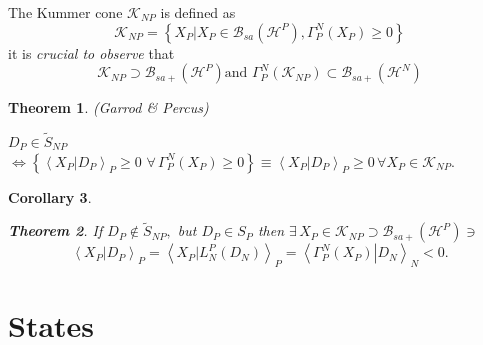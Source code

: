 \documentclass[aps,preprint]{revtex4}%
\newtheorem{theorem}{Theorem}
\newtheorem{corollary}[theorem]{Corollary}
\begin{document}
The Kummer cone $\mathcal{K}_{NP}$ is defined as
\begin{equation}
\mathcal{K}_{NP}=\left\{  \left.  X_{P}\right\vert X_{P}\in\mathcal{B}%
_{sa}\left(  \mathcal{H}^{P}\right)  ,\Gamma_{P}^{N}\left(  X_{P}\right)
\geq0\right\}
\end{equation}
it is \emph{crucial to observe} that
\begin{equation}
\mathcal{K}_{NP}\supset\mathcal{B}_{sa+}\left(  \mathcal{H}^{P}\right)  \text{
and }\Gamma_{P}^{N}\left(  \mathcal{K}_{NP}\right)  \subset\mathcal{B}%
_{sa+}\left(  \mathcal{H}^{N}\right)
\end{equation}


\begin{theorem}
(Garrod \& Percus)
\end{theorem}

$D_{P}\in\tilde{S}_{NP}$ $\Longleftrightarrow\left\{  \left\langle \left.
X_{P}\right\vert D_{P}\right\rangle _{P}\geq0\,\,\forall\,\Gamma_{P}%
^{N}\left(  X_{P}\right)  \geq0\right\}  \equiv\left\langle \left.
X_{P}\right\vert D_{P}\right\rangle _{P}\geq0\,\forall X_{P}\in\mathcal{K}%
_{NP}.$

\begin{corollary}
\begin{theorem}
If $D_{P}\notin\tilde{S}_{NP},$ but $D_{P}\in S_{P}$ then $\exists\,X_{P}%
\in\mathcal{K}_{NP}\supset\mathcal{B}_{sa+}\left(  \mathcal{H}^{P}\right)
\ni$
\begin{equation}
\left\langle \left.  X_{P}\right\vert D_{P}\right\rangle _{P}=\left\langle
\left.  X_{P}\right\vert L_{N}^{P}\left(  D_{N}\right)  \right\rangle
_{P}=\left\langle \left.  \Gamma_{P}^{N}\left(  X_{P}\right)  \right\vert
D_{N}\right\rangle _{N}<0.
\end{equation}

\end{theorem}
\end{corollary}

\section{States}
\end{document}
